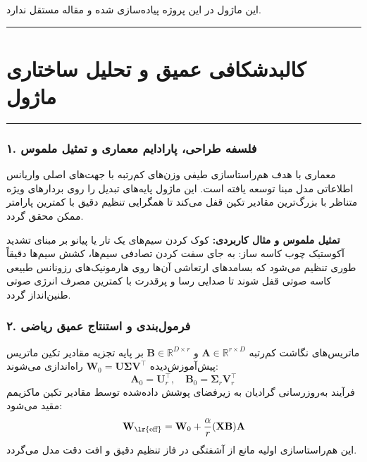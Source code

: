 \clearpage
{}
\vspace*{0.2cm}

این ماژول در این پروژه پیاده‌سازی شده و مقاله مستقل ندارد.
\noindent\rule{\textwidth}{1.2pt}
\vspace*{0.1cm}
\section{کالبدشکافی عمیق و تحلیل ساختاری ماژول }
\label{sec:mod_salt}
\vspace*{-0.2cm}
\noindent\rule{\textwidth}{0.5pt}
\vspace*{0.3cm}

\subsubsection*{۱. فلسفه طراحی، پارادایم معماری و تمثیل ملموس}
معماری  با هدف هم‌راستاسازی طیفی وزن‌های کم‌رتبه با جهت‌های اصلی واریانس اطلاعاتی مدل مبنا توسعه یافته است. این ماژول پایه‌های تبدیل را روی بردارهای ویژه متناظر با بزرگ‌ترین مقادیر تکین قفل می‌کند تا همگرایی تنظیم دقیق با کمترین پارامتر ممکن محقق گردد.

\textbf{تمثیل ملموس و مثال کاربردی:}
کوک کردن سیم‌های یک تار یا پیانو بر مبنای تشدید آکوستیک چوب کاسه ساز: به جای سفت کردن تصادفی سیم‌ها، کشش سیم‌ها دقیقاً طوری تنظیم می‌شود که بسامدهای ارتعاشی آن‌ها روی هارمونیک‌های رزونانس طبیعی کاسه صوتی قفل شوند تا صدایی رسا و پرقدرت با کمترین مصرف انرژی صوتی طنین‌انداز گردد.

\subsubsection*{۲. فرمول‌بندی و استنتاج عمیق ریاضی }
ماتریس‌های نگاشت کم‌رتبه $\mathbf{A} \in \mathbb{R}^{r \times D}$ و $\mathbf{B} \in \mathbb{R}^{D \times r}$ بر پایه تجزیه مقادیر تکین ماتریس پیش‌آموزش‌دیده $\mathbf{W}_0 = \mathbf{U} \boldsymbol{\Sigma} \mathbf{V}^\top$ راه‌اندازی می‌شوند:
\begin{equation}
\mathbf{A}_0 = \mathbf{U}_r^\top, \quad \mathbf{B}_0 = \boldsymbol{\Sigma}_r \mathbf{V}_r^\top
\end{equation}
فرآیند به‌روزرسانی گرادیان به زیرفضای پوشش داده‌شده توسط مقادیر تکین ماکزیمم مقید می‌شود:
\begin{equation}
\mathbf{W}_{\text{\lr{eff}}} = \mathbf{W}_0 + \frac{\alpha}{r} (\mathbf{X} \mathbf{B}) \mathbf{A}
\end{equation}
این هم‌راستاسازی اولیه مانع از آشفتگی در فاز تنظیم دقیق و افت دقت مدل می‌گردد.

